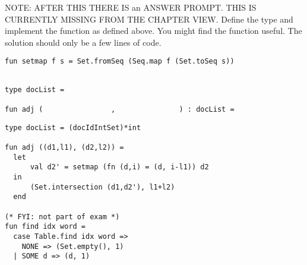 \begin{problem}
NOTE: AFTER THIS THERE IS an ANSWER PROMPT.  THIS IS CURRENTLY MISSING FROM THE CHAPTER VIEW.
\answer
Define the  type and implement the function  as defined above.
You might find the function  useful. The solution should
only be a few lines of code.
\begin{lstlisting}[numbers=none]
fun setmap f s = Set.fromSeq (Seq.map f (Set.toSeq s)) 
\end{lstlisting}

\begin{lstlisting}[numbers=none]

type docList = 

fun adj (                ,               ) : docList =
\end{lstlisting}

\sol
\begin{lstlisting}[numbers=none]
type docList = (docIdIntSet)*int

fun adj ((d1,l1), (d2,l2)) = 
  let 
      val d2' = setmap (fn (d,i) = (d, i-l1)) d2
  in  
      (Set.intersection (d1,d2'), l1+l2)
  end

(* FYI: not part of exam *)
fun find idx word = 
  case Table.find idx word =>
    NONE => (Set.empty(), 1)
  | SOME d => (d, 1)
\end{lstlisting}
\end{problem}
   







